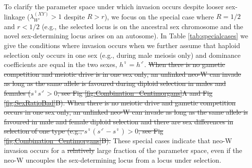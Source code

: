 \documentclass[10pt,letterpaper]{article}
\providecommand{\DIFaddtex}[1]{{\protect\color{blue}\uwave{#1}}} %
\providecommand{\DIFdeltex}[1]{{\protect\color{red}\sout{#1}}}                      %
\providecommand{\DIFaddbegin}{} %
\providecommand{\DIFaddend}{} %
\providecommand{\DIFdelbegin}{} %
\providecommand{\DIFdelend}{} %
\providecommand{\DIFadd}[1]{\texorpdfstring{\DIFaddtex{#1}}{#1}} %
\providecommand{\DIFdel}[1]{\texorpdfstring{\DIFdeltex{#1}}{}} %
\begin{document}

\DIFaddend %
To clarify the parameter space under which invasion occurs despite looser sex-linkage ($\lambda_{W'}^{(XY)}>1$ despite $R>r$\DIFaddbegin \DIFadd{; Conclusion 1B}\DIFaddend ), we focus on the special case where $R=1/2$ and $r<1/2$ (e.g., the selected locus is on the ancestral sex chromosome and the novel sex-determining locus arises on an autosome). 
In Table \ref{tab:specialcases} we give the conditions where invasion occurs when we further assume that haploid selection only occurs in one sex (e.g., during male meiosis only) and dominance coefficients are equal in the two sexes, $h^\female=h^\male$. 
\DIFdelbegin \DIFdel{When there is no gametic competition and meiotic drive is in one sex only, an unlinked neo-W can invade as long as the same allele is favoured during diploid selection in males and females ($s^\female s^\male>0$, see Fig \ref{fig:Combination_Centimorgans}A and Fig \ref{fig:SexRatioBad}B). %
When there is no meiotic drive and gametic competition occurs in one sex only, an unlinked neo-W can invade as long as the same allele is favoured in male and female diploid selection and there are sex differences in selection of one type (e.g., $s^\female(s^\male-s^\female)>0$, see Fig \ref{fig:Combination_Centimorgans}B). %
}\DIFdelend These special cases indicate that neo-W invasion occurs for a \DIFdelbegin \DIFdel{relatively }\DIFdelend large fraction of the parameter space, even if the neo-W uncouples the sex-determining locus from a locus under selection. 
\end{document}
